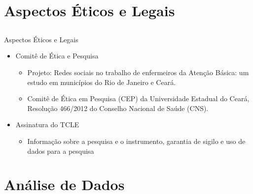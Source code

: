\documentclass[10pt]{beamer}
\begin{document}
\section{Aspectos Éticos e Legais}
\subsection{}
\begin{frame}{Aspectos Éticos e Legais}{}
  \begin{itemize}
	\item Comitê de Ética e Pesquisa 
    \begin{itemize}
    	\item Projeto: Redes sociais no trabalho de enfermeiros da Atenção Básica: um estudo em municípios do Rio de Janeiro e Ceará.
		\item Comitê de Ética em Pesquisa (CEP) da Universidade Estadual do Ceará, Resolução 466/2012 do Conselho Nacional de Saúde (CNS).
    \end{itemize}
    \item Assinatura do TCLE
    \begin{itemize}
		\item Informação sobre a pesquisa e o instrumento, garantia de sigilo e uso de dados para a pesquisa
    \end{itemize}
  \end{itemize}
\end{frame}


\section{Análise de Dados}
\end{document}
